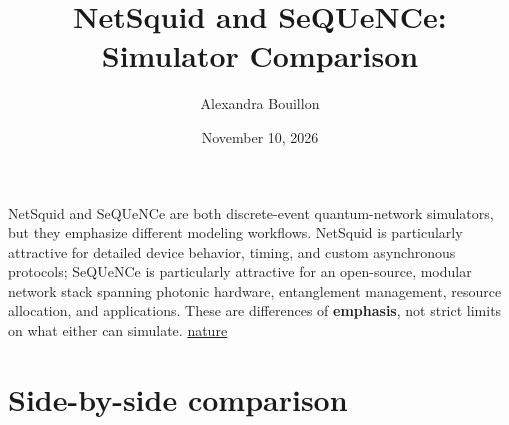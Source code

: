 \documentclass[11pt]{article}
\title{NetSquid and SeQUeNCe: Simulator Comparison}
\author{Alexandra Bouillon}
\date{November 10, 2026}
\newcommand{\nature}{\href{https://www.nature.com/articles/s42005-021-00647-8}{nature}}
\begin{document}
\maketitle

NetSquid and SeQUeNCe are both discrete-event quantum-network simulators, but they emphasize different modeling workflows. NetSquid is particularly attractive for detailed device behavior, timing, and custom asynchronous protocols; SeQUeNCe is particularly attractive for an open-source, modular network stack spanning photonic hardware, entanglement management, resource allocation, and applications. These are differences of \textbf{emphasis}, not strict limits on what either can simulate. \nature

\section{Side-by-side comparison}
\end{document}
